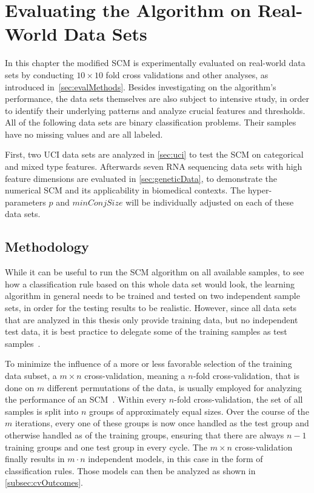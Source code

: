 \chapter{Evaluating the Algorithm on Real-World Data Sets}\label{ch:evaluation}

In this chapter the modified SCM is experimentally evaluated on real-world data sets by conducting \(10 \times 10\) fold cross validations and other analyses,
as introduced in~\autoref{sec:evalMethods}.
Besides investigating on the algorithm's performance, the data sets themselves are also subject to intensive study,
in order to identify their underlying patterns and analyze crucial features and thresholds.
All of the following data sets are binary classification problems.
Their samples have no missing values and are all labeled.

First, two UCI data sets are analyzed in \autoref{sec:uci} to test the SCM on categorical and mixed type features.
Afterwards seven RNA sequencing data sets with high feature dimensions are evaluated in \autoref{sec:geneticData},
to demonstrate the numerical SCM and its applicability in biomedical contexts.
The hyper-parameters \(p\) and \(minConjSize\) will be individually adjusted on each
of these data sets.

\section{Methodology}\label{sec:evalMethods} %

While it can be useful to run the SCM algorithm on all available samples, to see how a classification
rule based on this whole data set would look, the learning algorithm in general needs to be trained and tested on two
independent sample sets, in order for the testing results to be realistic.
However, since all data sets that are analyzed in this thesis only provide training data, but no
independent test data, it is best practice to delegate some of the training samples as test samples~\citep{kestler11}.

To minimize the influence of a more or less favorable selection of the training data subset,
a \(m \times n\) cross-validation, meaning a \(n\)-fold cross-validation, that is done on \(m\) different permutations of the data,
is usually employed for analyzing the performance of an SCM~\citep{muessel, kestler11}.
Within every \(n\)-fold cross-validation, the set of all samples is split into \(n\) groups of approximately equal sizes.
Over the course of the \(m\) iterations, every one of these groups is now once handled as the test group and
otherwise handled as of the training groups, ensuring that there are always \(n-1\) training groups and one test
group in every cycle.
The \(m \times n\) cross-validation finally results in \(m \cdot n\) independent models,
in this case in the form of classification rules.
Those models can then be analyzed as shown in \autoref{subsec:cvOutcomes}.

